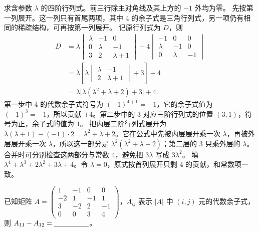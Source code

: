 \documentclass[UTF8,zihao=-4,fontset=fandol]{ctexart}
\begin{document}
\Solution
\Known 求含参数 $\lambda$ 的四阶行列式。前三行除主对角线及其上方的 $-1$ 外均为零。
\Method 先按第一列展开。这一列只有首尾两项，其中 $4$ 的余子式是三角行列式，另一项仍有相同的稀疏结构，可再按第一列展开。
\Derive 记原行列式为 $D$，则
\[
\begin{aligned}
D&=\lambda\begin{vmatrix}\lambda&-1&0\\0&\lambda&-1\\3&2&\lambda+1\end{vmatrix}
 -4\begin{vmatrix}-1&0&0\\\lambda&-1&0\\0&\lambda&-1\end{vmatrix}\\
 &=\lambda\left[\lambda
 \begin{vmatrix}\lambda&-1\\2&\lambda+1\end{vmatrix}+3\right]+4\\
 &=\lambda\bigl[\lambda(\lambda^2+\lambda+2)+3\bigr]+4.
\end{aligned}
\]
第一步中 $4$ 的代数余子式符号为 $(-1)^{4+1}=-1$，它的余子式值为 $(-1)^3=-1$，所以贡献 $+4$。第二步中的 $3$ 对应三阶行列式的位置 $(3,1)$，符号为正，余子式的值为 $1$。
把内层二阶行列式展开为 $\lambda(\lambda+1)-(-1)\cdot2=\lambda^2+\lambda+2$。它在公式中先被内层展开乘一次 $\lambda$，再被外层展开乘一次 $\lambda$，所以这一部分是 $\lambda^2(\lambda^2+\lambda+2)$；第二层的 $3$ 只乘外层的 $\lambda$。合并时可分别检查这两部分与常数 $4$，避免把 $3\lambda$ 写成 $3\lambda^2$。
\Verify 填 $\boxed{\lambda^4+\lambda^3+2\lambda^2+3\lambda+4}$。令 $\lambda=0$，原式按首列展开只剩 $4$ 的贡献，和常数项一致。

已知矩阵 $A=\begin{pmatrix}1&-1&0&0\\-2&1&-1&1\\3&-2&2&-1\\0&0&3&4\end{pmatrix}$，$A_{ij}$ 表示 $|A|$ 中 $(i,j)$ 元的代数余子式，则 $A_{11}-A_{12}=\underline{\hspace{5em}}$。
\end{document}
